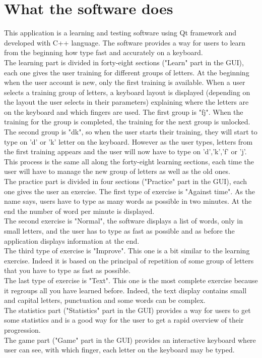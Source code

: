 \section{What the software does}
This application is a learning and testing software using Qt framework and developed with C++ language. The software provides a way for users to learn from the beginning how type fast and accurately on a keyboard.
\\
The learning part is divided in forty-eight sections ("Learn" part in the GUI), each one gives the user training for different groups of letters. At the beginning when the user account is new, only the first training is available. When a user selects a training group of letters, a keyboard layout is displayed (depending on the layout the user selects in their parameters) explaining where the letters are on the keyboard and which fingers are used. The first group is "fj". When the training for the group is completed, the training for the next group is unlocked. The second group is "dk", so when the user starts their training, they will start to type on 'd' or 'k' letter on the keyboard. However as the user types, letters from the first training appears and the user will now have to type on 'd','k','f' or 'j'. This process is the same all along the forty-eight learning sections, each time the user will have to manage the new group of letters as well as the old ones.
\\
The practice part is divided in four sections ("Practice" part in the GUI), each one gives the user an exercise. The first type of exercise is "Against time". As the name says, users have to type as many words as possible in two minutes. At the end the number of word per minute is displayed.\\
The second exercise is "Normal", the software displays a list of words, only in small letters, and the user has to type as fast as possible and as before the application displays information at the end.\\
The third type of exercise is "Improve". This one is a bit similar to the learning exercise. Indeed it is based on the principal of repetition of some group of letters that you have to type as fast as possible.\\
The last type of exercise is "Text". This one is the most complete exercise because it regroups all you have learned before. Indeed, the text display contains small and capital letters, punctuation and some words can be complex.
\\
The statistics part ("Statistics" part in the GUI) provides a way for users to get some statistics and is a good way for the user to get a rapid overview of their progression.
\\
The game part ("Game" part in the GUI) provides an interactive keyboard where user can see, with which finger, each letter on the keyboard may be typed.
          

